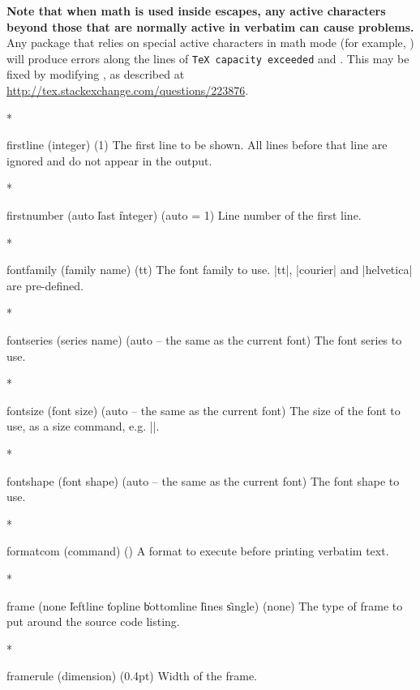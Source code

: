 \begin{paracol}{2}
\begin{optionlist}
\textbf{Note that when math is used inside escapes, any active characters beyond those that are normally active in verbatim can cause problems.}  Any package that relies on special active characters in math mode (for example, ) will produce errors along the lines of \texttt{TeX capacity exceeded} and \texttt{\string\leavevmode \string\kern \string\z@}.  This may be fixed by modifying \texttt{\string\@noligs}, as described at \url{http://tex.stackexchange.com/questions/223876}.
\switchcolumn

\switchcolumn[0]*%
  \item[firstline (integer) (1)]
    The first line to be shown.
    All lines before that line are ignored and do not appear in the output.
    \switchcolumn

\switchcolumn[0]*%
  \item[firstnumber (auto \| last \| integer) (auto = 1)]
    Line number of the first line.
    \switchcolumn

\switchcolumn[0]*%
  \item[fontfamily (family name) (tt)]
    The font family to use.
    |tt|, |courier| and |helvetica| are pre-defined.
    \switchcolumn

\switchcolumn[0]*%
  \item[fontseries (series name) (auto \textrm{-- the same as the current font})]
    The font series to use.
    \switchcolumn

\switchcolumn[0]*%
  \item[fontsize (font size) (auto \textrm{-- the same as the current font})]
    The size of the font to use, as a size command, e.g. |\footnotesize|.
    \switchcolumn

\switchcolumn[0]*%
  \item[fontshape (font shape) (auto \textrm{-- the same as the current font})]
    The font shape to use.
    \switchcolumn

\switchcolumn[0]*%
  \item[formatcom (command) (\meta{none})]
    A format to execute before printing verbatim text.
    \switchcolumn

\switchcolumn[0]*%
  \item[frame (none \| leftline \| topline \| bottomline \| lines \| single) (none)]
    The type of frame to put around the source code listing.
    \switchcolumn

\switchcolumn[0]*%
  \item[framerule (dimension) (0.4pt)]
    Width of the frame.
    \switchcolumn


\end{optionlist}
\end{paracol}
